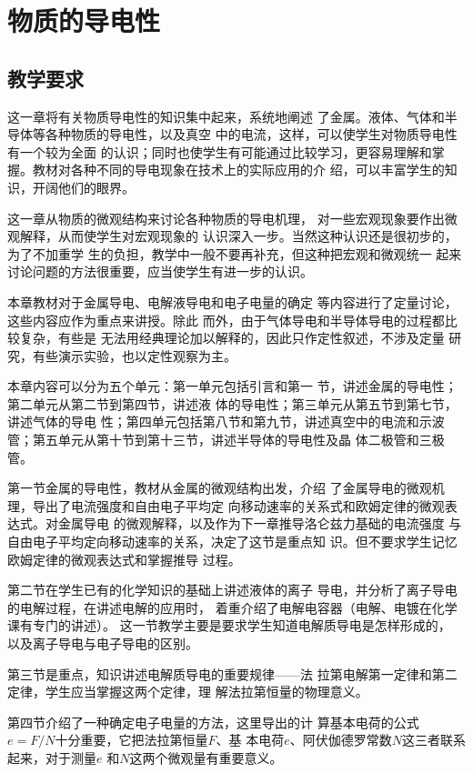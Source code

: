 \chapter{物质的导电性}\minitoc[n]
\section{教学要求}
这一章将有关物质导电性的知识集中起来，系统地阐述
了金属。液体、气体和半导体等各种物质的导电性，以及真空
中的电流，这样，可以使学生对物质导电性有一个较为全面
的认识；同时也使学生有可能通过比较学习，更容易理解和掌
握。教材对各种不同的导电现象在技术上的实际应用的介
绍，可以丰富学生的知识，开阔他们的眼界。

这一章从物质的微观结构来讨论各种物质的导电机理，
对一些宏观现象要作出微观解释，从而使学生对宏观现象的
认识深入一步。当然这种认识还是很初步的，为了不加重学
生的负担，教学中一般不要再补充，但这种把宏观和微观统一
起来讨论问题的方法很重要，应当使学生有进一步的认识。

本章教材对于金属导电、电解液导电和电子电量的确定
等内容进行了定量讨论，这些内容应作为重点来讲授。除此
而外，由于气体导电和半导体导电的过程都比较复杂，有些是
无法用经典理论加以解释的，因此只作定性叙述，不涉及定量
研究，有些演示实验，也以定性观察为主。

本章内容可以分为五个单元：第一单元包括引言和第一
节，讲述金属的导电性；第二单元从第二节到第四节，讲述液
体的导电性；第三单元从第五节到第七节，讲述气体的导电
性；第四单元包括第八节和第九节，讲述真空中的电流和示波
管；第五单元从第十节到第十三节，讲述半导体的导电性及晶
体二极管和三极管。

第一节金属的导电性，教材从金属的微观结构出发，介绍
了金属导电的微观机理，导出了电流强度和自由电子平均定
向移动速率的关系式和欧姆定律的微观表达式。对金属导电
的微观解释，以及作为下一章推导洛仑兹力基础的电流强度
与自由电子平均定向移动速率的关系，决定了这节是重点知
识。但不要求学生记忆欧姆定律的微观表达式和掌握推导
过程。

第二节在学生已有的化学知识的基础上讲述液体的离子
导电，并分析了离子导电的电解过程，在讲述电解的应用时，
着重介绍了电解电容器（电解、电镀在化学课有专门的讲述）。
这一节教学主要是要求学生知道电解质导电是怎样形成的，
以及离子导电与电子导电的区别。

第三节是重点，知识讲述电解质导电的重要规律——法
拉第电解第一定律和第二定律，学生应当掌握这两个定律，理
解法拉第恒量的物理意义。

第四节介绍了一种确定电子电量的方法，这里导出的计
算基本电荷的公式$e=F/N$十分重要，它把法拉第恒量$F$、基
本电荷$e$、阿伏伽德罗常数$N$这三者联系起来，对于测量$e$
和$N$这两个微观量有重要意义。

